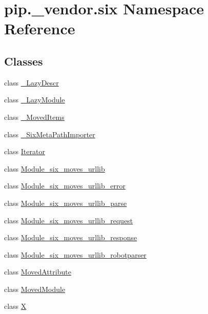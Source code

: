 \hypertarget{namespacepip_1_1__vendor_1_1six}{}\section{pip.\+\_\+vendor.\+six Namespace Reference}
\label{namespacepip_1_1__vendor_1_1six}
\subsection*{Classes}
\begin{DoxyCompactItemize}
\item 
class \hyperlink{classpip_1_1__vendor_1_1six_1_1__LazyDescr}{\+\_\+\+Lazy\+Descr}
\item 
class \hyperlink{classpip_1_1__vendor_1_1six_1_1__LazyModule}{\+\_\+\+Lazy\+Module}
\item 
class \hyperlink{classpip_1_1__vendor_1_1six_1_1__MovedItems}{\+\_\+\+Moved\+Items}
\item 
class \hyperlink{classpip_1_1__vendor_1_1six_1_1__SixMetaPathImporter}{\+\_\+\+Six\+Meta\+Path\+Importer}
\item 
class \hyperlink{classpip_1_1__vendor_1_1six_1_1Iterator}{Iterator}
\item 
class \hyperlink{classpip_1_1__vendor_1_1six_1_1Module__six__moves__urllib}{Module\+\_\+six\+\_\+moves\+\_\+urllib}
\item 
class \hyperlink{classpip_1_1__vendor_1_1six_1_1Module__six__moves__urllib__error}{Module\+\_\+six\+\_\+moves\+\_\+urllib\+\_\+error}
\item 
class \hyperlink{classpip_1_1__vendor_1_1six_1_1Module__six__moves__urllib__parse}{Module\+\_\+six\+\_\+moves\+\_\+urllib\+\_\+parse}
\item 
class \hyperlink{classpip_1_1__vendor_1_1six_1_1Module__six__moves__urllib__request}{Module\+\_\+six\+\_\+moves\+\_\+urllib\+\_\+request}
\item 
class \hyperlink{classpip_1_1__vendor_1_1six_1_1Module__six__moves__urllib__response}{Module\+\_\+six\+\_\+moves\+\_\+urllib\+\_\+response}
\item 
class \hyperlink{classpip_1_1__vendor_1_1six_1_1Module__six__moves__urllib__robotparser}{Module\+\_\+six\+\_\+moves\+\_\+urllib\+\_\+robotparser}
\item 
class \hyperlink{classpip_1_1__vendor_1_1six_1_1MovedAttribute}{Moved\+Attribute}
\item 
class \hyperlink{classpip_1_1__vendor_1_1six_1_1MovedModule}{Moved\+Module}
\item 
class \hyperlink{classpip_1_1__vendor_1_1six_1_1X}{X}
\end{DoxyCompactItemize}

